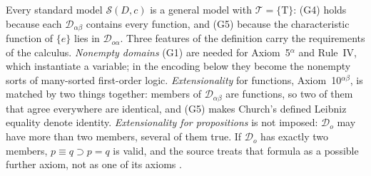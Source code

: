Every standard model \(\mathcal S(D,c)\) is a general model with
\(\mathcal T=\{\mathrm T\}\): (G4) holds because each
\(\mathcal D_{\alpha\beta}\) contains every function, and (G5) because the
characteristic function of \(\{e\}\) lies in \(\mathcal D_{o\alpha}\).  Three
features of the definition carry the requirements of the calculus.
\emph{Nonempty domains} (G1) are needed for Axiom~5\(^\alpha\) and Rule~IV,
which instantiate a variable; in the encoding below they become the nonempty
sorts of many-sorted first-order logic.  \emph{Extensionality} for
functions, Axiom~10\(^{\alpha\beta}\), is matched by two things together:
members of \(\mathcal D_{\alpha\beta}\) are functions, so two of them that
agree everywhere are identical, and (G5) makes Church's defined Leibniz
equality denote identity.  \emph{Extensionality for propositions} is not
imposed: \(\mathcal D_o\) may have more than two members, several of them
true.  If \(\mathcal D_o\) has exactly two members, \(p\equiv q\supset p=q\)
is valid, and the source treats that formula as a possible further axiom,
not as one of its axioms \cite[\S4, p.~61]{Church1940}.

